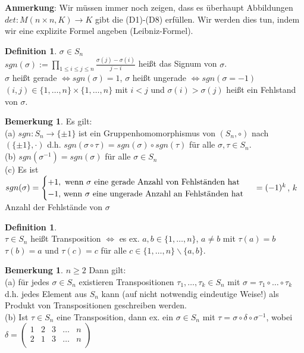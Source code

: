 \documentclass[10pt,a4paper,numbers=endperiod]{scrartcl}
\theoremstyle{definition}
\newtheorem{defi}[satz]{Definition}
\newtheorem{bem}[satz]{Bemerkung}
\begin{document}
\textbf{Anmerkung}: Wir müssen immer noch zeigen, dass es überhaupt Abbildungen $det: M(n \times n, K) \rightarrow K$ gibt die (D1)-(D8) erfüllen. Wir werden dies tun, indem wir eine explizite Formel angeben (Leibniz-Formel).

\begin{defi}
	$\sigma \in S_n$\\
	$sgn(\sigma):= \prod\limits_{1 \leq i \leq j \leq n} \frac{\sigma(j) - \sigma(i)}{j-i}$ heißt das Signum von $\sigma$.\\
	$\sigma$ heißt gerade $\Leftrightarrow sgn(\sigma) =1$, $\sigma$ heißt ungerade $\Leftrightarrow sgn(\sigma = -1)$\\
	$(i,j) \in \{1, \ldots, n\} \times \{1, \ldots, n\}$ mit $i<j$ und $\sigma(i) > \sigma(j)$ heißt ein Fehlstand von $\sigma$. 
\end{defi}

\begin{bem}
	Es gilt:\\
	(a) $sgn: S_n \rightarrow \{\pm1\}$ ist ein Gruppenhomomorphismus von $(S_n, \circ)$ nach $(\{\pm1\}, \cdot)$ d.h. $sgn(\sigma \circ \tau) =  sgn(\sigma) \circ sgn(\tau)$ für alle $\sigma, \tau \in S_n$.\\
	(b) $sgn(\sigma^{-1}) = sgn(\sigma)$ für alle $\sigma \in S_n$\\
	(c) Es ist $sgn(\sigma) = \begin{cases}
	+1, \text{ wenn $\sigma$ eine gerade Anzahl von Fehlständen hat}\\
	-1 \text{, wenn $\sigma$ eine ungerade Anzahl an Fehlständen hat}
	\end{cases}\\
	= (-1)^k$, $k$ Anzahl der Fehlstände von $\sigma$\\
\end{bem}

\begin{defi}
	$ $\\
	$\tau \in S_n$ heißt Transposition $\Leftrightarrow$ es ex. $a,b \in \{1,\ldots,n\}$, $a \neq b$ mit $\tau(a) = b$ $\tau(b) = a$ und $\tau(c) = c$ für alle $c \in \{1, \ldots,n\} \backslash \{a,b\}$.
\end{defi}

\begin{bem}
	$n \geq 2$ Dann gilt:\\
	(a) für jedes $\sigma \in S_n$ existieren Transpositionen $\tau_1, \ldots, \tau_k \in S_n$ mit $ \sigma = \tau_1 \circ \ldots \circ \tau_k$ d.h. jedes Element aus $S_n$ kann (auf nicht notwendig eindeutige Weise!) als Produkt von Transpositionen geschreiben werden.\\
	(b) Ist $\tau \in S_n$ eine Transposition, dann ex. ein $\sigma \in S_n$ mit $\tau = \sigma \circ \delta \circ \sigma^{-1}$, wobei $\delta= \begin{pmatrix}
	1&2&3&\dots&n\\
	2&1&3&\dots&n\\
	\end{pmatrix}$
\end{bem}
\end{document}
